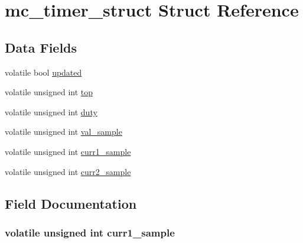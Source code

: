\hypertarget{structmc__timer__struct}{}\section{mc\+\_\+timer\+\_\+struct Struct Reference}
\label{structmc__timer__struct}
\subsection*{Data Fields}
\begin{DoxyCompactItemize}
\item 
volatile bool \hyperlink{structmc__timer__struct_a887f35472e8fca904645ffb1b0279a74}{updated}
\item 
volatile unsigned int \hyperlink{structmc__timer__struct_a176bf23e5c7cc33d5b38b845751fd197}{top}
\item 
volatile unsigned int \hyperlink{structmc__timer__struct_af41cb3abb6bf4e62e8c669366bb02af1}{duty}
\item 
volatile unsigned int \hyperlink{structmc__timer__struct_a001e05cb9a513b98cab13e155050c4fc}{val\+\_\+sample}
\item 
volatile unsigned int \hyperlink{structmc__timer__struct_a1aff69d53b5c8c5ca274e4bc3928fbb7}{curr1\+\_\+sample}
\item 
volatile unsigned int \hyperlink{structmc__timer__struct_ae8dfa699c956026f247b5f4b41f978a3}{curr2\+\_\+sample}
\end{DoxyCompactItemize}


\subsection{Field Documentation}
\hypertarget{structmc__timer__struct_a1aff69d53b5c8c5ca274e4bc3928fbb7}{}
\subsubsection[{curr1\+\_\+sample}]{\setlength{\rightskip}{0pt plus 5cm}volatile unsigned int curr1\+\_\+sample}\label{structmc__timer__struct_a1aff69d53b5c8c5ca274e4bc3928fbb7}
\hypertarget{structmc__timer__struct_ae8dfa699c956026f247b5f4b41f978a3}{}

